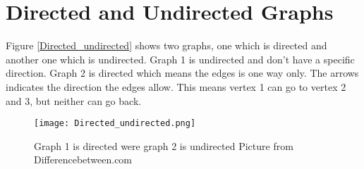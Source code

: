 \section{Directed and Undirected Graphs}
Figure \cref{Directed_undirected} shows two graphs, one which is directed and another one which is undirected. Graph 1 is undirected and don't have a specific direction. Graph 2 is directed which means the edges is one way only. The arrows indicates the direction the edges allow. This means vertex 1 can go to vertex 2 and 3, but neither can go back. 


\begin{figure}[ht!]
    \centering
    \texttt{[image: Directed\_undirected.png]}
    \label{fig:labeled_Directed_undirected}
    \caption{Graph 1 is directed were graph 2 is undirected \newline Picture from Differencebetween.com\cite{dir_pic}}
  \end{figure}